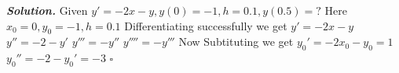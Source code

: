 \documentclass[12pt]{article}
\newenvironment{solution}[1][\it{Solution}]{\textbf{#1. } }{$\square$}
\begin{document}
\begin{solution}
    Given \(y'=-2x-y, y(0)=-1, h=0.1, y(0.5)=?\) \newline
    Here \(x_0=0,y_0=-1,h=0.1\) \newline
    Differentiating successfully we get \newline
    \(y'=-2x-y\) \newline
    \(y''=-2-y'\) \newline
    \(y'''=-y''\) \newline
    \(y''''=-y'''\) \newline
    Now Subtituting we get 
    \(y_0'=-2x_0-y_0=1\) \newline
    \(y_0''=-2-y_0'=-3\) \newline
    \newline
    \newline
\end{solution}
\end{document}
